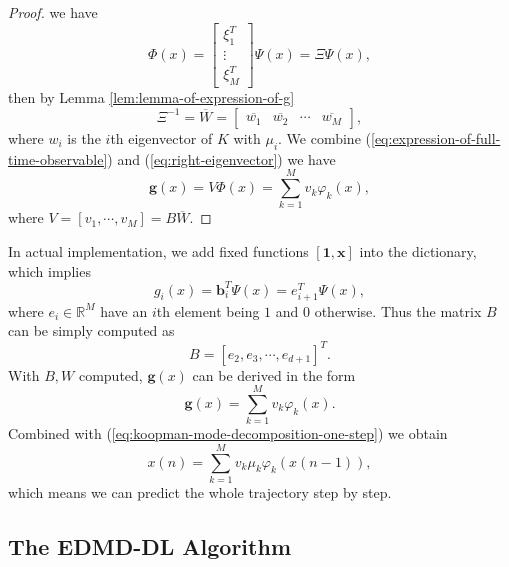 \documentclass[en, bibend=bibtex]{elegantpaper}
\theoremstyle{plain}
\begin{document}
\begin{proof}
  we have
  \begin{equation*}
    \Phi(x) = \left[
      \begin{array}{c}
        \xi_1^T\\
        \vdots\\
        \xi_M^T
      \end{array}
    \right] \Psi(x) = \Xi \Psi(x),
  \end{equation*}
  then by Lemma \ref{lem:lemma-of-expression-of-g}
  \begin{equation}
    \label{eq:right-eigenvector}
    \Xi^{-1} = \overline{W}
    = \left[
      \begin{array}{cccc}
        \overline{w_1}&\overline{w_2}&\cdots&\overline{w_M}
      \end{array}
    \right],
  \end{equation}
  where $w_i$ is the $i$th eigenvector of $K$ with $\mu_i$.
  We combine (\ref{eq:expression-of-full-time-observable})
  and (\ref{eq:right-eigenvector})
  we have
  \begin{equation}
    \label{eq:expression-of-g}
    \mathbf{g}(x) = V \Phi(x) = \sum\limits_{k = 1}^M v_k \varphi_k(x),
  \end{equation}
  where $V = [v_1,\cdots,v_M] = B\overline{W} $.
\end{proof}

In actual implementation,
we add fixed functions
$[\mathbf{1}, \mathbf{x}]$ into the dictionary,
which implies
\begin{equation*}
g_i(x) = \mathbf{b}_i^T \Psi(x) = e_{i+1}^T \Psi(x),
\end{equation*}
where $e_i \in \mathbb{R}^M$ have an $i$th element being $1$
and $0$ otherwise.
Thus the matrix $B$ can be simply computed as
\begin{equation*}
  B = [e_2, e_3, \cdots, e_{d+1}]^T.
\end{equation*}
With $B, W$ computed, $\mathbf{g}(x)$ can be derived in the form
\begin{equation*}
  \mathbf{g}(x) = \sum\limits_{k = 1}^M v_k\varphi_k(x).
\end{equation*}
Combined with (\ref{eq:koopman-mode-decomposition-one-step}) we obtain
\begin{equation*}
  x(n) = \sum\limits_{k = 1}^M v_k \mu_k \varphi_k(x(n-1)),
\end{equation*}
which means we can predict the whole trajectory step by step.

\subsection{The EDMD-DL Algorithm}
\end{document}
